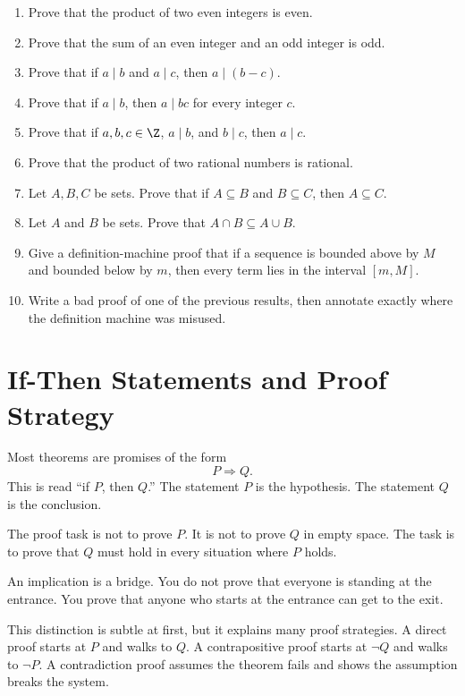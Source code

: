 \begin{enumerate}
\item Prove that the product of two even integers is even.
\item Prove that the sum of an even integer and an odd integer is odd.
\item Prove that if $a\mid b$ and $a\mid c$, then $a\mid(b-c)$.
\item Prove that if $a\mid b$, then $a\mid bc$ for every integer $c$.
\item Prove that if $a,b,c\in\Z$, $a\mid b$, and $b\mid c$, then $a\mid c$.
\item Prove that the product of two rational numbers is rational.
\item Let $A,B,C$ be sets. Prove that if $A\subseteq B$ and $B\subseteq C$, then $A\subseteq C$.
\item Let $A$ and $B$ be sets. Prove that $A\cap B\subseteq A\cup B$.
\item Give a definition-machine proof that if a sequence is bounded above by $M$ and bounded below by $m$, then every term lies in the interval $[m,M]$.
\item Write a bad proof of one of the previous results, then annotate exactly where the definition machine was misused.
\end{enumerate}

\newpage
\section{If-Then Statements and Proof Strategy}

Most theorems are promises of the form
\[
P\Rightarrow Q.
\]
This is read ``if $P$, then $Q$.'' The statement $P$ is the hypothesis. The statement $Q$ is the conclusion.

The proof task is not to prove $P$. It is not to prove $Q$ in empty space. The task is to prove that $Q$ must hold in every situation where $P$ holds.

\begin{focusbox}
An implication is a bridge. You do not prove that everyone is standing at the entrance. You prove that anyone who starts at the entrance can get to the exit.
\end{focusbox}

This distinction is subtle at first, but it explains many proof strategies. A direct proof starts at $P$ and walks to $Q$. A contrapositive proof starts at $\neg Q$ and walks to $\neg P$. A contradiction proof assumes the theorem fails and shows the assumption breaks the system.

